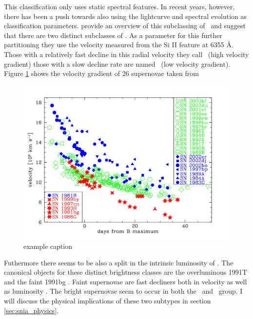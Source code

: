 This classification only uses static spectral features. In recent years, however, there has been a push towards also using the lightcurve and spectral evolution as classification parameters. \citet{2005ApJ...623.1011B} provide an overview of this subclassing of \sneia\ and suggest that there are two distinct subclasses of \sneia. As a parameter for this further partitioning they use the velocity measured from the Si II feature at 6355 \AA. Those with a relatively fast decline in this radial velocity they call \hvg\ (high velocity gradient) those with a slow decline rate are named \lvg\ (low velocity gradient). 
Figure \ref{fig:sn_class_lvg_hvg} shows the velocity gradient of 26 supernovae taken from  \citet{2005ApJ...623.1011B}

\begin{figure}[htbp] %
   \centering
   \includegraphics[width=\textwidth]{chapter_intro/plots/velocity_gradient.pdf} 
   \caption{example caption}
   \label{fig:sn_class_lvg_hvg}
\end{figure}

Futhermore there seems to be also a split in the intrinsic luminosity of \sneia. The canonical objects for these distinct brightness classes are the overluminous 1991T \citet{1992AJ....103.1632P} and the faint 1991bg .
Faint supernovae are fast decliners both in velocity as well as luminosity \citet{2005ApJ...623.1011B}. The bright supernovae seem to occur in both the \hvg\ and \lvg\ group. I will discuss the physical implications of these two subtypes in section \ref{sec:snia_physics}.

